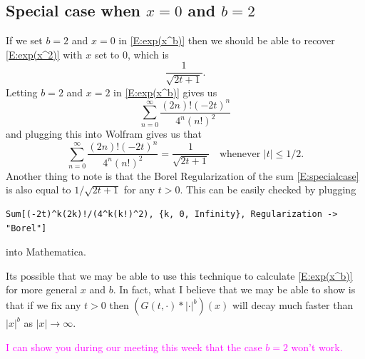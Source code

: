 \documentclass{article}
\numberwithin{equation}{section}
\begin{document}
\subsection{Special case when $x=0$ and $b=2$}\label{S:SpecCase}
If we set $b=2$ and $x=0$ in \eqref{E:exp(x^b)} then we should be able to recover \eqref{E:exp(x^2)} with $x$ set to $0$, which is
\[
\frac{1}{\sqrt{2t+1}}.
\]
Letting $b=2$ and $x=2$ in \eqref{E:exp(x^b)} gives us
\begin{equation}\label{E:specialcase}
\sum_{n=0}^\infty \frac{(2n)!(-2t)^n}{4^n(n!)^2}
\end{equation}
and plugging this into Wolfram gives us that
\[
\sum_{n=0}^\infty \frac{(2n)!(-2t)^n}{4^n(n!)^2} = \frac{1}{\sqrt{2t+1}} \quad \text{whenever } |t| \le 1/2.
\]
Another thing to note is that the Borel Regularization of the sum \eqref{E:specialcase} is also equal to $1/\sqrt{2t+1}$ for any $t>0$. This can be easily checked by plugging
\begin{verbatim}
Sum[(-2t)^k(2k)!/(4^k(k!)^2), {k, 0, Infinity}, Regularization -> "Borel"]
\end{verbatim}
into Mathematica.

Its possible that we may be able to use this technique to calculate \eqref{E:exp(x^b)} for more general $x$ and $b$. In fact, what I believe that we may be able to show is that if we fix any $t >0$ then $(G(t,\cdot) * |\cdot|^b)(x)$ will decay much faster than $|x|^b$ as $|x| \to \infty$.

\bigskip

\textcolor{magenta}{I can show you during our meeting this week that the case $b=2$ won't work.}
\end{document}
